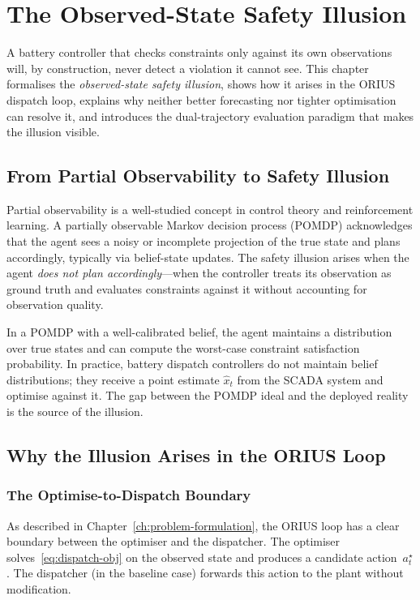 
\chapter{The Observed-State Safety Illusion}
\label{ch:safety-illusion}

A battery controller that checks constraints only against its own
observations will, by construction, never detect a violation it cannot
see.  This chapter formalises the \emph{observed-state safety illusion},
shows how it arises in the ORIUS dispatch loop, explains why neither
better forecasting nor tighter optimisation can resolve it, and introduces
the dual-trajectory evaluation paradigm that makes the illusion visible.

\section{From Partial Observability to Safety Illusion}

Partial observability is a well-studied concept in control theory and
reinforcement learning.  A partially observable Markov decision process
(POMDP) acknowledges that the agent sees a noisy or incomplete projection
of the true state and plans accordingly, typically via belief-state
updates.  The safety illusion arises when the agent \emph{does not plan
accordingly}---when the controller treats its observation as ground truth
and evaluates constraints against it without accounting for observation
quality.

In a POMDP with a well-calibrated belief, the agent maintains a
distribution over true states and can compute the worst-case constraint
satisfaction probability.  In practice, battery dispatch controllers do
not maintain belief distributions; they receive a point estimate
$\hat{x}_t$ from the SCADA system and optimise against it.  The gap
between the POMDP ideal and the deployed reality is the source of the
illusion.


\section{Why the Illusion Arises in the ORIUS Loop}

\subsection{The Optimise-to-Dispatch Boundary}

As described in Chapter~\ref{ch:problem-formulation}, the ORIUS loop
has a clear boundary between the optimiser and the dispatcher.  The
optimiser solves~\eqref{eq:dispatch-obj} on the observed state and
produces a candidate action~$a_t^{\star}$.  The dispatcher (in the
baseline case) forwards this action to the plant without modification.

